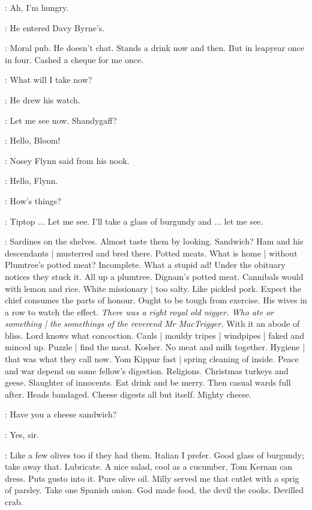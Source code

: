 \BloomInt:
Ah, I'm hungry.

:
He entered Davy Byrne's.

\BloomInt:
Moral pub.
He doesn't chat.
Stands a drink now and then.
But in leapyear once in four.
Cashed a cheque for me once.

\BloomInt:
What will I take now?

:
He drew his watch.

\BloomInt:
Let me see now.
Shandygaff?

\nosey:
Hello, Bloom!

:
Nosey Flynn said from his nook.

\Bloom:
Hello,
Flynn.

\nosey:
How's things?

\Bloom:
Tiptop ...
Let me see.
I'll take a glass of burgundy and ...
let me see.

\BloomInt:
Sardines on the shelves.
Almost taste them by looking.
Sandwich?
Ham and his descendants |
musterred and bred there.
Potted meats.
What is home |
without Plumtree's potted meat?
Incomplete.
What a stupid ad!
Under the obituary notices they stuck it.
All up a plumtree.
Dignam's potted meat.
Cannibals would with lemon and rice.
White missionary |
too salty.
Like pickled pork.
Expect the chief consumes the parts of honour.
Ought to be tough from exercise.
His wives in a row to watch the effect.
\emph{There was a right royal old nigger.
Who ate or something |
the somethings of the reverend Mr MacTrigger.}
With it an abode of bliss.
Lord knows what concoction.
Cauls |
mouldy tripes |
windpipes |
faked and minced up.
Puzzle |
find the meat.
Kosher.
No meat and milk together.
Hygiene |
that was what they call now.
Yom Kippur fast |
spring cleaning of inside.
Peace and war depend on some fellow's digestion.
Religions.
Christmas turkeys and geese.
Slaughter of innocents.
Eat drink and be merry.
Then casual wards full after.
Heads bandaged.
Cheese digests all but itself.
Mighty cheese.

\Bloom:
Have you a cheese sandwich?

\curate:
Yes, sir.

\BloomInt:
Like a few olives too if they had them.
Italian I prefer.
Good glass of burgundy;
take away that.
Lubricate.
A nice salad,
cool as a cucumber,
Tom Kernan can dress.
Puts gusto into it.
Pure olive oil.
Milly served me that cutlet with a sprig of parsley.
Take one Spanish onion.
God made food,
the devil the cooks.
Devilled crab.

